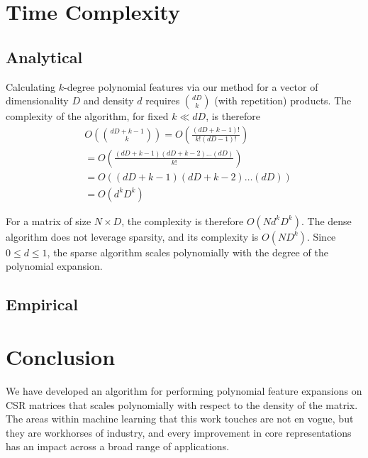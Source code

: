 \documentclass{article}
\begin{document}
\section{Time Complexity}
\subsection{Analytical}

Calculating $k$-degree polynomial features via our method for a vector of dimensionality $D$ and density $d$ requires $\binom{dD}{k}$ (with repetition) products.
The complexity of the algorithm, for fixed $k \ll dD$, is therefore
\begin{align}
& O\left(\binom{dD+k-1}{k}\right) = O\left(\frac{(dD+k-1)!}{k!(dD-1)!}\right)\\
& = O\left(\frac{(dD+k-1)(dD+k-2) \dots (dD)}{k!}\right)\\
& = O\left((dD+k-1)(dD+k-2) \dots (dD)\right)\\
& = O\left(d^kD^k\right)
\end{align}

For a matrix of size $N \times D$, the complexity is therefore $O\left(Nd^kD^k\right)$.
The dense algorithm does not leverage sparsity, and its complexity is $O\left(ND^k\right)$.
Since $0 \le d \le 1$, the sparse algorithm scales polynomially with the degree of the polynomial expansion.

\subsection{Empirical}


\section{Conclusion}
We have developed an algorithm for performing polynomial feature expansions on CSR matrices that scales polynomially with respect to the density of the matrix.
The areas within machine learning that this work touches are not en vogue, but they are workhorses of industry, and every improvement in core representations has an impact across a broad range of applications. 



\end{document}

